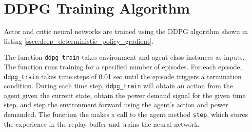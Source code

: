 \section{DDPG Training Algorithm}
Actor and critic neural networks are trained using the DDPG algorithm shown in listing \ref{ssec:deep_deterministic_policy_gradient}. 

The function \verb|ddpg_train| takes environment and agent class instances as inputs. The function runs training for a specified number of episodes. For each episode, \verb|ddpg_train| takes time steps of 0.01 sec until the episode triggers a termination condition. During each time step, \verb|ddpg_train| will obtain an action from the agent given the current state, obtain the power demand signal for the given time step, and step the environment forward using the agent's action and power demanded. The function the makes a call to the agent method \verb|step|, which stores the experience in the replay buffer and trains the neural network.